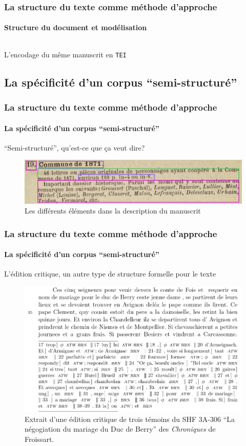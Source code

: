 \documentclass{beamer}
\begin{document}
\begin{frame}
	\frametitle{La structure du texte comme méthode d'approche}
	\framesubtitle{Structure du document et modélisation}
	
	\begin{listing}[h]
		\centering
		\inputminted{xml}{includes/tei_item.xml}
		\caption{L'encodage du même manuscrit en \texttt{TEI}}
	\end{listing}
\end{frame}

\subsection{La spécificité d'un corpus \enquote{semi-structuré}}
\begin{frame}
	\frametitle{La structure du texte comme méthode d'approche}
	\framesubtitle{La spécificité d'un corpus \enquote{semi-structuré}}
	
	\enquote{Semi-structuré}, qu'est-ce que ça veut dire?
	\begin{figure}[h]
		\centering
		\includegraphics[width=\textwidth]{includes/tei_item_zone.png}
		\caption{Les différents éléments dans la description du manuscrit}
	\end{figure}
\end{frame}

\begin{frame}
	\frametitle{La structure du texte comme méthode d'approche}
	\framesubtitle{La spécificité d'un corpus \enquote{semi-structuré}}
	
	L'édition critique, un autre type de structure formelle pour le texte
	\begin{figure}[h]
		\centering
		\includegraphics[height=0.4\textheight]{includes/textcrit.png}
		\caption{Extrait d'une édition critique de trois témoins du SHF 3A-306 \enquote{La négogiation du mariage du Duc de Berry} des \textit{Chroniques} de Froissart.}
	\end{figure}
\end{frame}
\end{document}

